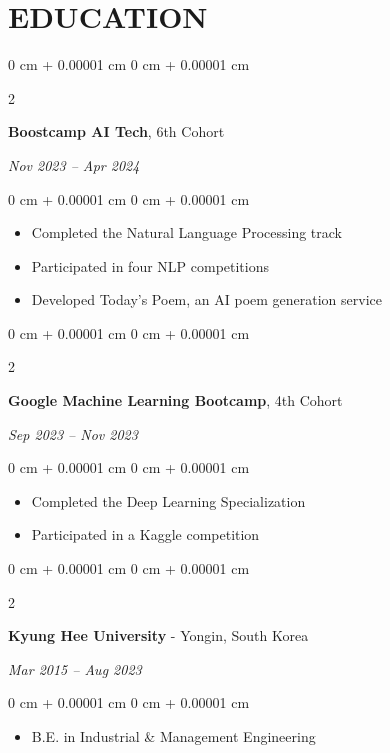 \documentclass[10pt, letterpaper]{article}
\newenvironment{highlights}{
    \begin{itemize}[
        topsep=0.10 cm,
        parsep=0.10 cm,
        partopsep=0pt,
        itemsep=0pt,
        leftmargin=0 cm + 10pt
    ]
}{
    \end{itemize}
} %
\newenvironment{onecolentry}{
    \begin{adjustwidth}{
        0 cm + 0.00001 cm
    }{
        0 cm + 0.00001 cm
    }
}{
    \end{adjustwidth}
} %
\newenvironment{twocolentry}[2][]{
    \onecolentry
    \def\secondColumn{\textit{#2}}
    \setcolumnwidth{\fill, 4.5 cm}
    \begin{paracol}{2}
}{
    \switchcolumn \raggedleft \secondColumn
    \end{paracol}
    \endonecolentry
} %
\begin{document}
    \vspace{5 pt - 0.3 cm}
    \section{EDUCATION}
        \begin{twocolentry}{
            Nov 2023 -- Apr 2024
        }
            \textbf{Boostcamp AI Tech}, 6th Cohort
        \end{twocolentry}

        \vspace{0.10 cm}
        \begin{onecolentry}
            \begin{highlights}
                \item Completed the Natural Language Processing track
                \item Participated in four NLP competitions
                \item Developed Today's Poem, an AI poem generation service
            \end{highlights}
        \end{onecolentry}

        \vspace{0.2 cm}
        \begin{twocolentry}{
            Sep 2023 -- Nov 2023
        }
            \textbf{Google Machine Learning Bootcamp}, 4th Cohort
        \end{twocolentry}

        \vspace{0.10 cm}
        \begin{onecolentry}
            \begin{highlights}
                \item Completed the Deep Learning Specialization
                \item Participated in a Kaggle competition
            \end{highlights}
        \end{onecolentry}

        \vspace{0.2 cm}
        \begin{twocolentry}{
            Mar 2015 -- Aug 2023
        }
            \textbf{Kyung Hee University} - Yongin, South Korea
        \end{twocolentry}

        \vspace{0.10 cm}
        \begin{onecolentry}
            \begin{highlights}
                \item B.E. in Industrial \& Management Engineering
            \end{highlights}
        \end{onecolentry}
\end{document}
